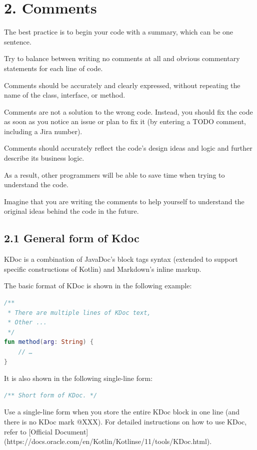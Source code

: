 \section*{\textbf{2. Comments}}



The best practice is to begin your code with a summary, which can be one sentence.

Try to balance between writing no comments at all and obvious commentary statements for each line of code.

Comments should be accurately and clearly expressed, without repeating the name of the class, interface, or method.

Comments are not a solution to the wrong code. Instead, you should fix the code as soon as you notice an issue or plan to fix it (by entering a TODO comment, including a Jira number).

Comments should accurately reflect the code's design ideas and logic and further describe its business logic.

As a result, other programmers will be able to save time when trying to understand the code.

Imagine that you are writing the comments to help yourself to understand the original ideas behind the code in the future.



\subsection*{\textbf{2.1 General form of Kdoc}}



KDoc is a combination of JavaDoc's block tags syntax (extended to support specific constructions of Kotlin) and Markdown's inline markup.

The basic format of KDoc is shown in the following example:



\begin{lstlisting}[language=Kotlin]
 /**
 * There are multiple lines of KDoc text,
 * Other ...
 */
fun method(arg: String) {
    // …
}
\end{lstlisting}


It is also shown in the following single-line form:



\begin{lstlisting}[language=Kotlin]
 /** Short form of KDoc. */
\end{lstlisting}
Use a single-line form when you store the entire KDoc block in one line (and there is no KDoc mark @XXX). For detailed instructions on how to use KDoc, refer to [Official Document](https://docs.oracle.com/en/Kotlin/Kotlinse/11/tools/KDoc.html).



